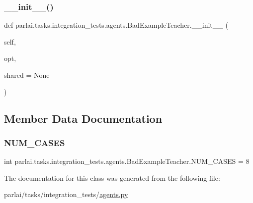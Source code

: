 \subsubsection{\texorpdfstring{\+\_\+\+\_\+init\+\_\+\+\_\+()}{\_\_init\_\_()}}
{\footnotesize\ttfamily def parlai.\+tasks.\+integration\+\_\+tests.\+agents.\+Bad\+Example\+Teacher.\+\_\+\+\_\+init\+\_\+\+\_\+ (\begin{DoxyParamCaption}\item[{}]{self,  }\item[{}]{opt,  }\item[{}]{shared = {\ttfamily None} }\end{DoxyParamCaption})}



\subsection{Member Data Documentation}
\mbox{\label{classparlai_1_1tasks_1_1integration__tests_1_1agents_1_1BadExampleTeacher_aa13107dbd3fd1bbff91491e2860ea6dc}} 
\subsubsection{\texorpdfstring{N\+U\+M\+\_\+\+C\+A\+S\+ES}{NUM\_CASES}}
{\footnotesize\ttfamily int parlai.\+tasks.\+integration\+\_\+tests.\+agents.\+Bad\+Example\+Teacher.\+N\+U\+M\+\_\+\+C\+A\+S\+ES = 8\hspace{0.3cm}{\ttfamily [static]}}



The documentation for this class was generated from the following file\+:\begin{DoxyCompactItemize}
\item 
parlai/tasks/integration\+\_\+tests/\hyperlink{parlai_2tasks_2integration__tests_2agents_8py}{agents.\+py}\end{DoxyCompactItemize}
